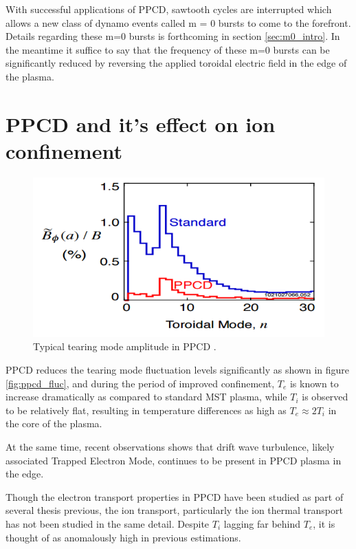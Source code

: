 \begin{refsection}
With successful applications of PPCD, sawtooth cycles are interrupted which allows a new class of dynamo events called m = 0 bursts to come to the forefront. Details regarding these m=0 bursts is forthcoming in section \ref{sec:m0_intro}. In the meantime it suffice to say that the frequency of these m=0 bursts can be significantly reduced by reversing the applied toroidal electric field in the edge of the plasma\cite{Chapman2001}.

\section{PPCD and it's effect on ion confinement} \label{sec:PPCD_characteristic}

\begin{figure}
    \centering
    \includegraphics{./1_Introduction/ppcd_fluc.png}
    \caption[Typical tearing mode amplitude in PPCD]{Typical tearing mode amplitude in PPCD .}
\end{figure}

PPCD reduces the tearing mode fluctuation levels significantly as shown in figure \ref{fig:ppcd_fluc}, and during the period of improved confinement, $T_e$ is known to increase dramatically as compared to standard MST plasma, while $T_i$ is observed to be relatively flat, resulting in temperature differences as high as $T_e \approx 2T_i$ in the core of the plasma. 


At the same time, recent observations shows that drift wave turbulence, likely associated Trapped Electron Mode, continues to be present in PPCD plasma in the edge. 

Though the electron transport properties in PPCD have been studied as part of several thesis previous, the ion transport, particularly the ion thermal transport has not been studied in the same detail. Despite $T_i$ lagging far behind $T_e$, it is thought of as anomalously high in previous estimations. 




\end{refsection}
